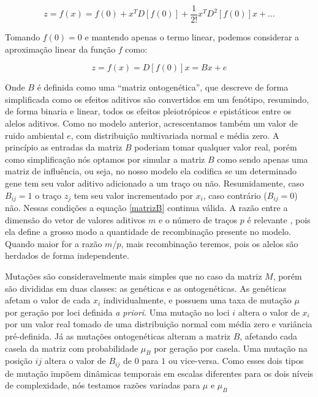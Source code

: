 \begin{equation}
z = f(x) = f(0) + x^T D[f(0)] + \frac{1}{2!} x^T D^2 [f(0)] x + \ldots
\end{equation}

Tomando $f(0) = 0$ e mantendo apenas o termo linear, podemos considerar
a aproximação linear da função $f$ como:

\begin{equation}
z = f(x) = D[f(0)]x = Bx + e
\label{matrizB}
\end{equation}

Onde $B$ é definida como uma ``matriz ontogenética'', que descreve de
forma simplificada como os efeitos aditivos são convertidos em um
fenótipo, resumindo, de forma binaria e linear, todos os efeitos
pleiotrópicos e epistáticos entre os alelos aditivos.
Como no modelo anterior, acrescentamos também um valor de ruido
ambiental $e$, com distribuição multivariada normal e média zero.
A princípio as entradas da matriz $B$ poderiam tomar qualquer valor
real, porém como simplificação nós optamos por simular a matriz $B$ como
sendo apenas uma matriz de influência, ou seja, no nosso modelo ela
codifica se um determinado gene tem seu valor aditivo adicionado a um
traço ou não.
Resumidamente, caso $B_{ij} = 1$ o traço $z_j$ tem seu valor
incrementado por $x_i$, caso contrário ($B_{ij} = 0$) não.
Nessas condições a equação \ref{matrizB} continua válida.
A razão entre a dimensão do vetor de valores aditivos $m$ e o número de
traços $p$ é relevante \citep{Wagner1984}, pois ela define a grosso modo
a quantidade de recombinação presente no modelo.
Quando maior for a razão $m/p$, mais
recombinação teremos, pois os alelos são herdados de forma independente.

Mutações são consideravelmente mais simples que no caso da
matriz $M$, porém são divididas em duas classes: as genéticas e as
ontogenéticas.
As genéticas afetam o valor de cada $x_i$ individualmente, e possuem uma
taxa de mutação $\mu$ por geração por loci definida {\it a priori}.
Uma mutação no loci $i$ altera o valor de $x_i$ por um valor real tomado
de uma distribuição normal com média zero e variância pré-definida.
Já as mutações ontogenéticas alteram a matriz $B$, afetando cada casela
da matriz com probabilidade $\mu_B$ por geração por casela.
Uma mutação na posição $ij$ altera o valor de $B_{ij}$ de $0$ para $1$
ou vice-versa.
Como esses dois tipos de mutação impõem dinâmicas temporais em escalas
diferentes para os dois níveis de complexidade, nós testamos razões
variadas para $\mu$ e $\mu_B$

